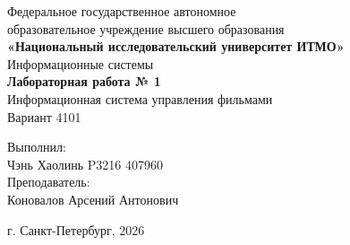 \begin{titlepage}
\centering
Федеральное государственное автономное \\
образовательное учреждение высшего образования \\
\textbf{«Национальный исследовательский университет ИТМО»} \\
\vfill
Информационные системы\\
\vspace{0.5\baselineskip}
\textbf{Лабораторная работа № 1} \\
\vspace{0.5\baselineskip}
Информационная система управления фильмами\\
Вариант 4101\\
\vfill
\begin{flushright}
Выполнил:\\
Чэнь Хаолинь P3216 407960\\
Преподаватель:\\
Коновалов Арсений Антонович\\
\end{flushright}
\vspace{4\baselineskip}
\centering
г. Санкт-Петербург, 2026
\end{titlepage}
